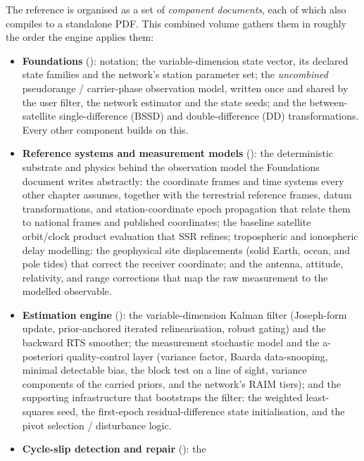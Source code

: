 \documentclass[11pt,letterpaper]{article}
\begin{document}
The reference is organised as a set of \emph{component documents}, each of
which also compiles to a standalone PDF.  This combined volume gathers
them in roughly the order the engine applies them:
\begin{itemize}[leftmargin=*]
\item \textbf{Foundations} ():
      notation; the variable-dimension state vector, its declared state
      families and the network's station parameter set; the
      \emph{uncombined} pseudorange / carrier-phase observation model,
      written once and shared by the user filter, the network estimator
      and the state seeds; and the between-satellite single-difference
      (BSSD) and double-difference (DD) transformations.  Every other
      component builds on this.
\item \textbf{Reference systems and measurement models}
      ():
      the deterministic substrate and physics behind the observation
      model the Foundations document writes abstractly: the coordinate
      frames and time systems every other chapter assumes, together with the terrestrial
      reference frames, datum transformations, and station-coordinate
      epoch propagation that relate them to national frames and published
      coordinates; the baseline
      satellite orbit/clock product evaluation that SSR refines;
      tropospheric and ionospheric delay modelling; the geophysical
      site displacements (solid Earth, ocean, and pole tides) that
      correct the receiver coordinate; and the antenna, attitude,
      relativity, and range corrections that map the raw measurement to
      the modelled observable.
\item \textbf{Estimation engine} ():
      the variable-dimension Kalman filter (Joseph-form update,
      prior-anchored iterated relinearisation, robust gating) and the
      backward RTS smoother; the measurement stochastic model and the
      a-posteriori quality-control layer (variance factor, Baarda
      data-snooping, minimal detectable bias, the block test on a line
      of sight, variance components of the carried priors, and the
      network's RAIM tiers); and the supporting infrastructure that
      bootstraps the filter: the weighted least-squares seed, the
      first-epoch residual-difference state initialisation, and the
      pivot selection / disturbance logic.
\item \textbf{Cycle-slip detection and repair} (): the

\end{itemize}
\end{document}
